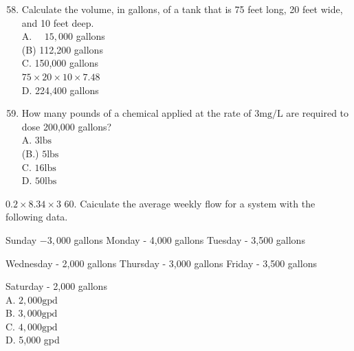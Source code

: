 \documentclass[10pt]{article}
\begin{document}
\begin{enumerate}
  \setcounter{enumi}{57}
  \item Calculate the volume, in gallons, of a tank that is 75 feet long, 20 feet wide, and 10 feet deep.\\
A. $\quad 15,000$ gallons\\
(B) 112,200 gallons\\
C. 150,000 gallons\\
$75 \times 20 \times 10 \times 7.48$\\
D. 224,400 gallons

  \item How many pounds of a chemical applied at the rate of $3 \mathrm{mg} / \mathrm{L}$ are required to dose 200,000 gallons?\\
A. $3 \mathrm{lbs}$\\
(B.) $5 \mathrm{lbs}$\\
C. $16 \mathrm{lbs}$\\
D. $50 \mathrm{lbs}$

\end{enumerate}

$0.2 \times 8.34 \times 3$ 60. Caiculate the average weekly flow for a system with the following data.

Sunday $-3,000$ gallons Monday - 4,000 gallons Tuesday - 3,500 gallons

Wednesday - 2,000 gallons Thursday - 3,000 gallons Friday - 3,500 gallons

Saturday - 2,000 gallons\\
A. $2,000 \mathrm{gpd}$\\
B. $3,000 \mathrm{gpd}$\\
C. $4,000 \mathrm{gpd}$\\
D. 5,000 gpd
\end{document}
